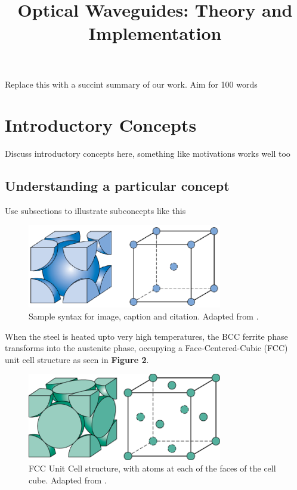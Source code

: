 \documentclass[10pt]{article}
\begin{document}
\noindent



\title{Optical Waveguides: Theory and Implementation}




\maketitle


\abstract
Replace this with a succint summary of our work. Aim for 100 words  

\section{Introductory Concepts}
Discuss introductory concepts here, something like motivations works well too

\subsection{Understanding a particular concept}
Use subsections to illustrate subconcepts like this
\begin{figure}[h]
    \centering
    \includegraphics[width=8.5cm]{fig1}
    \caption{\label{tab1} Sample syntax for image, caption and citation. Adapted from \cite{ref01}.} 
    \end{figure}

When the steel is heated upto very high temperatures, the BCC ferrite phase transforms into the austenite phase, occupying a Face-Centered-Cubic (FCC) unit cell structure as seen in \textbf{Figure 2}.
\begin{figure}[h]
    \centering
    \includegraphics[width=8.5cm]{fig2}
    \caption{\label{tab1}FCC Unit Cell structure, with atoms at each of the faces of the cell cube. Adapted from \cite{ref01}.} 
    \end{figure}
\end{document}
